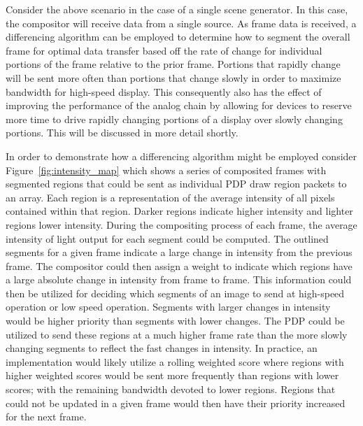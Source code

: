     Consider the above scenario in the case of a single scene generator. In this case, the compositor will receive data from a single source. As frame data is received, a differencing algorithm can be employed to determine how to segment the overall frame for optimal data transfer based off the rate of change for individual portions of the frame relative to the prior frame. Portions that rapidly change will be sent more often than portions that change slowly in order to maximize bandwidth for high-speed display. This consequently also has the effect of improving the performance of the analog chain by allowing for devices to reserve more time to drive rapidly changing portions of a display over slowly changing portions. This will be discussed in more detail shortly.

    In order to demonstrate how a differencing algorithm might be employed consider Figure~\ref{fig:intensity_map} which shows a series of composited frames with segmented regions that could be sent as individual PDP draw region packets to an array. Each region is a representation of the average intensity of all pixels contained within that region. Darker regions indicate higher intensity and lighter regions lower intensity. During the compositing process of each frame, the average intensity of light output for each segment could be computed. The outlined segments for a given frame indicate a large change in intensity from the previous frame. The compositor could then assign a weight to indicate which regions have a large absolute change in intensity from frame to frame. This information could then be utilized for deciding which segments of an image to send at high-speed operation or low speed operation. Segments with larger changes in intensity would be higher priority than segments with lower changes. The PDP could be utilized to send these regions at a much higher frame rate than the more slowly changing segments to reflect the fast changes in intensity. In practice, an implementation would likely utilize a rolling weighted score where regions with higher weighted scores would be sent more frequently than regions with lower scores; with the remaining bandwidth devoted to lower regions. Regions that could not be updated in a given frame would then have their priority increased for the next frame.

